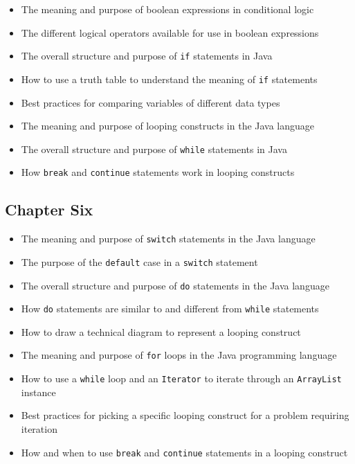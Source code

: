 \documentclass[11pt]{article}
\begin{document}
\begin{itemize}

  \itemsep -.015in
  \item The meaning and purpose of boolean expressions in conditional logic
  \item The different logical operators available for use in boolean expressions
  \item The overall structure and purpose of {\tt if} statements in Java
  \item How to use a truth table to understand the meaning of {\tt if} statements
  \item Best practices for comparing variables of different data types
  \item The meaning and purpose of looping constructs in the Java language
  \item The overall structure and purpose of {\tt while} statements in Java
  \item How {\tt break} and {\tt continue} statements work in looping constructs

\end{itemize}

\subsection*{Chapter Six}

\begin{itemize}

  \itemsep -.015in
  \item The meaning and purpose of {\tt switch} statements in the Java language
  \item The purpose of the {\tt default} case in a {\tt switch} statement
  \item The overall structure and purpose of {\tt do} statements in the Java language
  \item How {\tt do} statements are similar to and different from {\tt while} statements
  \item How to draw a technical diagram to represent a looping construct
  \item The meaning and purpose of {\tt for} loops in the Java programming language
  \item How to use a {\tt while} loop and an {\tt Iterator} to iterate through an {\tt ArrayList} instance
  \item Best practices for picking a specific looping construct for a problem requiring iteration
  \item How and when to use {\tt break} and {\tt continue} statements in a looping construct

\end{itemize}
\end{document}
